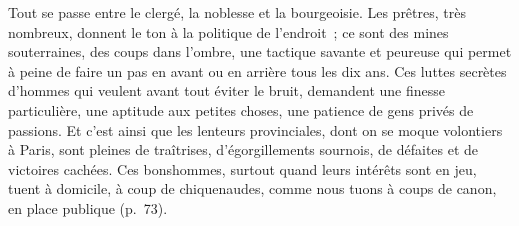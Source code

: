 \documentclass[11pt,twoside,openany]{book}
\newenvironment{lateiDocument}{}{}
\begin{document}
\begin{lateiDocument}
\begin{teiElement}[name={TEI},change={commons\_edition}]
\begin{teiElement}[name={text},type={book},xmlid={book}]
\begin{teiElement}[name={group},type={book},xmlid={book-001}]
\begin{teiElement}[name={group},type={section1},xmlid={section1-002}]
\begin{teiElement}
\begin{teiElement}[name={body},xmlid={body-008}]
\begin{teiDiv}[type={section1},xmlid={div01-7}]
\begin{teiCit}[xmlid={cit03-7}]
                \begin{teiQuote}
Tout se passe entre le clergé, la noblesse et la bourgeoisie. Les prêtres, très nombreux, donnent le ton à la politique de l’endroit ; ce sont des mines souterraines, des coups dans l’ombre, une tactique savante et peureuse qui permet à peine de faire un pas en avant ou en arrière tous les dix ans. Ces luttes secrètes d’hommes qui veulent avant tout éviter le bruit, demandent une finesse particulière, une aptitude aux petites choses, une patience de gens privés de passions. Et c’est ainsi que les lenteurs provinciales, dont on se moque volontiers à Paris, sont pleines de traîtrises, d’égorgillements sournois, de défaites et de victoires cachées. Ces bonshommes, surtout quand leurs intérêts sont en jeu, tuent à domicile, à coup de chiquenaudes, comme nous tuons à coups de canon, en place publique (p. 73).
\end{teiQuote}
              

\end{teiCit}
\end{teiDiv}
\end{teiElement}
\end{teiElement}
\end{teiElement}
\end{teiElement}
\end{teiElement}
\end{teiElement}
\end{lateiDocument}
\end{document}
